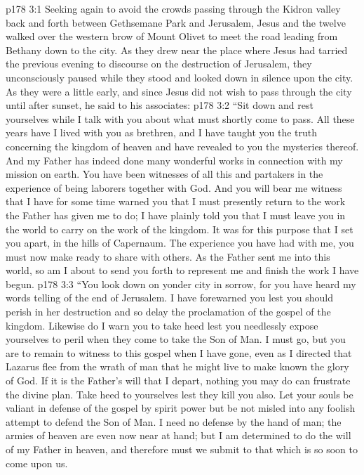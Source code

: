 \vs p178 3:1 Seeking again to avoid the crowds passing through the Kidron valley back and forth between Gethsemane Park and Jerusalem, Jesus and the twelve walked over the western brow of Mount Olivet to meet the road leading from Bethany down to the city. As they drew near the place where Jesus had tarried the previous evening to discourse on the destruction of Jerusalem, they unconsciously paused while they stood and looked down in silence upon the city. As they were a little early, and since Jesus did not wish to pass through the city until after sunset, he said to his associates:
\pc \vs p178 3:2 \textcolor{ubdarkred}{“Sit down and rest yourselves while I talk with you about what must shortly come to pass. All these years have I lived with you as brethren, and I have taught you the truth concerning the kingdom of heaven and have revealed to you the mysteries thereof. And my Father has indeed done many wonderful works in connection with my mission on earth. You have been witnesses of all this and partakers in the experience of being laborers together with God. And you will bear me witness that I have for some time warned you that I must presently return to the work the Father has given me to do; I have plainly told you that I must leave you in the world to carry on the work of the kingdom. It was for this purpose that I set you apart, in the hills of Capernaum. The experience you have had with me, you must now make ready to share with others. As the Father sent me into this world, so am I about to send you forth to represent me and finish the work I have begun.}
\vs p178 3:3 \textcolor{ubdarkred}{“You look down on yonder city in sorrow, for you have heard my words telling of the end of Jerusalem. I have forewarned you lest you should perish in her destruction and so delay the proclamation of the gospel of the kingdom. Likewise do I warn you to take heed lest you needlessly expose yourselves to peril when they come to take the Son of Man. I must go, but you are to remain to witness to this gospel when I have gone, even as I directed that Lazarus flee from the wrath of man that he might live to make known the glory of God. If it is the Father’s will that I depart, nothing you may do can frustrate the divine plan. Take heed to yourselves lest they kill you also. Let your souls be valiant in defense of the gospel by spirit power but be not misled into any foolish attempt to defend the Son of Man. I need no defense by the hand of man; the armies of heaven are even now near at hand; but I am determined to do the will of my Father in heaven, and therefore must we submit to that which is so soon to come upon us.}
